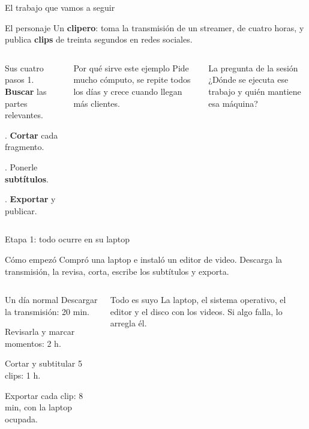 \documentclass[aspectratio=169,10pt,c]{beamer}
\begin{document}
\begin{frame}{El trabajo que vamos a seguir}
\begin{block}{El personaje}
\small Un \textbf{clipero}: toma la transmisión de un streamer, de cuatro horas, y publica \textbf{clips} de treinta segundos en redes sociales.
\end{block}
\begin{columns}[T,onlytextwidth]
\begin{exampleblock}{Sus cuatro pasos}
\small
1. \textbf{Buscar} las partes relevantes.\par{}. \textbf{Cortar} cada fragmento.\par{}. Ponerle \textbf{subtítulos}.\par{}. \textbf{Exportar} y publicar.
\end{exampleblock}
\begin{block}{Por qué sirve este ejemplo}
\small Pide mucho cómputo, se repite todos los días y crece cuando llegan más clientes.
\end{block}
\begin{alertblock}{La pregunta de la sesión}
\small ¿Dónde se ejecuta ese trabajo y quién mantiene esa máquina?
\end{alertblock}
\end{columns}
\end{frame}

\begin{frame}{Etapa 1: todo ocurre en su laptop}
\begin{block}{Cómo empezó}
\small Compró una laptop e instaló un editor de video. Descarga la transmisión, la revisa, corta, escribe los subtítulos y exporta.
\end{block}
\begin{columns}[T,onlytextwidth]
\begin{exampleblock}{Un día normal}
\small
Descargar la transmisión: 20 min.\par\smallskip
Revisarla y marcar momentos: 2 h.\par\smallskip
Cortar y subtitular 5 clips: 1 h.\par\smallskip
Exportar cada clip: 8 min, con la laptop ocupada.
\end{exampleblock}
\begin{block}{Todo es suyo}
\small La laptop, el sistema operativo, el editor y el disco con los videos. Si algo falla, lo arregla él.
\end{block}
\end{columns}
\end{frame}
\end{document}
